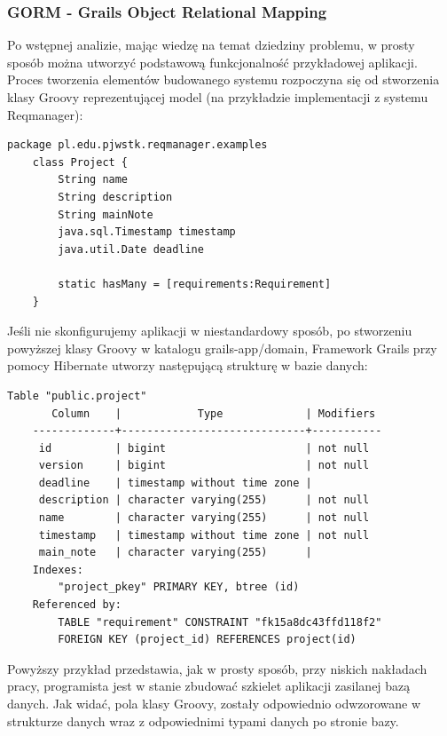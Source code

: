     \subsubsection{GORM - Grails Object Relational Mapping}
  
    Po wstępnej analizie, mając wiedzę na temat dziedziny problemu, w prosty sposób można utworzyć podstawową funkcjonalność przykładowej aplikacji. Proces tworzenia elementów budowanego systemu rozpoczyna się od stworzenia klasy Groovy reprezentującej model (na przykładzie implementacji z systemu Reqmanager):

    \begin{lstlisting}[caption={klasa modelu Project.groovy}, label={lst:modelExample}]
    package pl.edu.pjwstk.reqmanager.examples
    class Project {
        String name
        String description
        String mainNote
        java.sql.Timestamp timestamp
        java.util.Date deadline

        static hasMany = [requirements:Requirement]
    }
    \end{lstlisting}

    Jeśli nie skonfigurujemy aplikacji w niestandardowy sposób, po stworzeniu powyższej klasy Groovy w katalogu grails-app/domain, Framework Grails przy pomocy Hibernate utworzy następującą strukturę w bazie danych:

    \begin{lstlisting}[caption={struktura bazy danych dla modelu Project}, label={lst:dbSchemaProject}]
                      Table "public.project"
       Column    |            Type             | Modifiers 
    -------------+-----------------------------+-----------
     id          | bigint                      | not null
     version     | bigint                      | not null
     deadline    | timestamp without time zone | 
     description | character varying(255)      | not null
     name        | character varying(255)      | not null
     timestamp   | timestamp without time zone | not null
     main_note   | character varying(255)      | 
    Indexes:
        "project_pkey" PRIMARY KEY, btree (id)
    Referenced by:
        TABLE "requirement" CONSTRAINT "fk15a8dc43ffd118f2" 
        FOREIGN KEY (project_id) REFERENCES project(id)
    \end{lstlisting}

    Powyższy przykład przedstawia, jak w prosty sposób, przy niskich nakładach pracy, programista jest w stanie zbudować szkielet aplikacji zasilanej bazą danych. Jak widać, pola klasy Groovy, zostały odpowiednio odwzorowane w strukturze danych wraz z odpowiednimi typami danych po stronie bazy.

